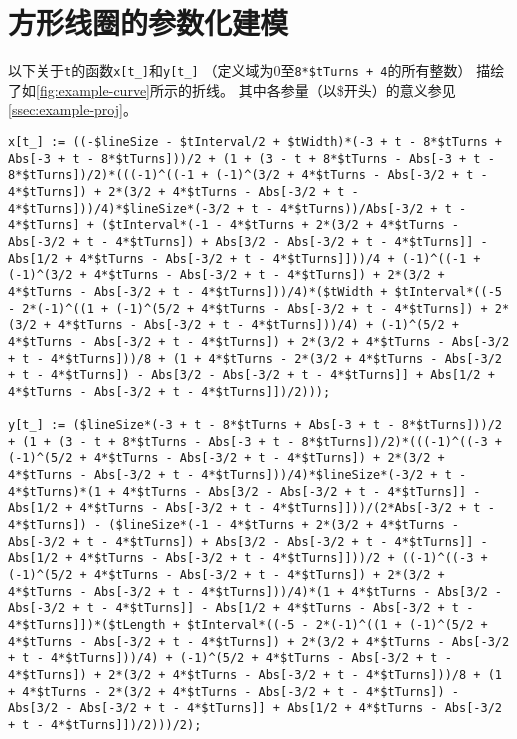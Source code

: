 \documentclass[index]{subfiles}
\begin{document}
\chapter{方形线圈的参数化建模}\label{sec:tricks}
以下关于\lstinline"t"的函数\lstinline"x[t_]"和\lstinline"y[t_]"
（定义域为0至\lstinline"8*$tTurns + 4"的所有整数）
描绘了如\cref{fig:example-curve}所示的折线。
其中各参量（以\$开头）的意义参见\cref{ssec:example-proj}。

\begin{lstlisting}[breaklines]
x[t_] := ((-$lineSize - $tInterval/2 + $tWidth)*(-3 + t - 8*$tTurns + Abs[-3 + t - 8*$tTurns]))/2 + (1 + (3 - t + 8*$tTurns - Abs[-3 + t - 8*$tTurns])/2)*(((-1)^((-1 + (-1)^(3/2 + 4*$tTurns - Abs[-3/2 + t - 4*$tTurns]) + 2*(3/2 + 4*$tTurns - Abs[-3/2 + t - 4*$tTurns]))/4)*$lineSize*(-3/2 + t - 4*$tTurns))/Abs[-3/2 + t - 4*$tTurns] + ($tInterval*(-1 - 4*$tTurns + 2*(3/2 + 4*$tTurns - Abs[-3/2 + t - 4*$tTurns]) + Abs[3/2 - Abs[-3/2 + t - 4*$tTurns]] - Abs[1/2 + 4*$tTurns - Abs[-3/2 + t - 4*$tTurns]]))/4 + (-1)^((-1 + (-1)^(3/2 + 4*$tTurns - Abs[-3/2 + t - 4*$tTurns]) + 2*(3/2 + 4*$tTurns - Abs[-3/2 + t - 4*$tTurns]))/4)*($tWidth + $tInterval*((-5 - 2*(-1)^((1 + (-1)^(5/2 + 4*$tTurns - Abs[-3/2 + t - 4*$tTurns]) + 2*(3/2 + 4*$tTurns - Abs[-3/2 + t - 4*$tTurns]))/4) + (-1)^(5/2 + 4*$tTurns - Abs[-3/2 + t - 4*$tTurns]) + 2*(3/2 + 4*$tTurns - Abs[-3/2 + t - 4*$tTurns]))/8 + (1 + 4*$tTurns - 2*(3/2 + 4*$tTurns - Abs[-3/2 + t - 4*$tTurns]) - Abs[3/2 - Abs[-3/2 + t - 4*$tTurns]] + Abs[1/2 + 4*$tTurns - Abs[-3/2 + t - 4*$tTurns]])/2)));

y[t_] := ($lineSize*(-3 + t - 8*$tTurns + Abs[-3 + t - 8*$tTurns]))/2 + (1 + (3 - t + 8*$tTurns - Abs[-3 + t - 8*$tTurns])/2)*(((-1)^((-3 + (-1)^(5/2 + 4*$tTurns - Abs[-3/2 + t - 4*$tTurns]) + 2*(3/2 + 4*$tTurns - Abs[-3/2 + t - 4*$tTurns]))/4)*$lineSize*(-3/2 + t - 4*$tTurns)*(1 + 4*$tTurns - Abs[3/2 - Abs[-3/2 + t - 4*$tTurns]] - Abs[1/2 + 4*$tTurns - Abs[-3/2 + t - 4*$tTurns]]))/(2*Abs[-3/2 + t - 4*$tTurns]) - ($lineSize*(-1 - 4*$tTurns + 2*(3/2 + 4*$tTurns - Abs[-3/2 + t - 4*$tTurns]) + Abs[3/2 - Abs[-3/2 + t - 4*$tTurns]] - Abs[1/2 + 4*$tTurns - Abs[-3/2 + t - 4*$tTurns]]))/2 + ((-1)^((-3 + (-1)^(5/2 + 4*$tTurns - Abs[-3/2 + t - 4*$tTurns]) + 2*(3/2 + 4*$tTurns - Abs[-3/2 + t - 4*$tTurns]))/4)*(1 + 4*$tTurns - Abs[3/2 - Abs[-3/2 + t - 4*$tTurns]] - Abs[1/2 + 4*$tTurns - Abs[-3/2 + t - 4*$tTurns]])*($tLength + $tInterval*((-5 - 2*(-1)^((1 + (-1)^(5/2 + 4*$tTurns - Abs[-3/2 + t - 4*$tTurns]) + 2*(3/2 + 4*$tTurns - Abs[-3/2 + t - 4*$tTurns]))/4) + (-1)^(5/2 + 4*$tTurns - Abs[-3/2 + t - 4*$tTurns]) + 2*(3/2 + 4*$tTurns - Abs[-3/2 + t - 4*$tTurns]))/8 + (1 + 4*$tTurns - 2*(3/2 + 4*$tTurns - Abs[-3/2 + t - 4*$tTurns]) - Abs[3/2 - Abs[-3/2 + t - 4*$tTurns]] + Abs[1/2 + 4*$tTurns - Abs[-3/2 + t - 4*$tTurns]])/2)))/2);
\end{lstlisting}
\end{document}

